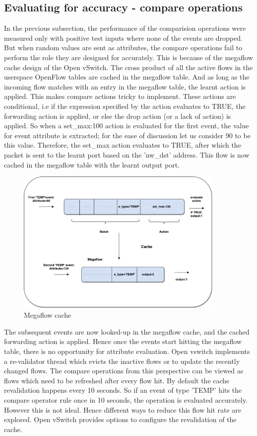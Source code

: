 \subsection{Evaluating for accuracy - compare operations}
In the previous subsection, the performance of the comparision operations were measured only with positive test inputs where none of the events are dropped. But when random values are sent as attributes, the compare operations fail to perform the role they are designed for accurately. This is because of the megaflow cache design of the Open vSwitch. The cross product of all the active flows in the userspace OpenFlow tables are cached in the megaflow table. And as long as the incoming flow matches with an entry in the megaflow table, the learnt action is applied. This makes compare actions tricky to implement. These actions are conditional, i.e if the expression specified by the action evaluates to TRUE, the forwarding action is applied, or else the drop action (or a lack of action) is applied. So when a set_max:100 action is evaluated for the first event, the value for event attribute is extracted; for the ease of discussion let us consider 90 to be this value. Therefore, the set_max action evaluates to TRUE, after which the packet is sent to the learnt port based on the 'nw_dst' address. This flow is now cached in the megaflow table with the learnt output port.
\begin{figure}[H]
	\centering
	\caption{Megaflow cache}
	\includegraphics[height=7cm]{learnandcache.pdf}
\end{figure}
The subsequent events are now looked-up in the megaflow cache, and the cached forwarding action is applied. Hence once the events start hitting the megaflow table, there is no opportunity for attribute evaluation. Open vswitch implements a re-validator thread which evicts the inactive flows or to update the recently changed flows. The compare operations from this perspective can be viewed as flows which need to be refreshed after every flow hit. By default the cache revalidation happens every 10 seconds. So if an event of type 'TEMP' hits the compare operator rule once in 10 seconds, the operation is evaluated accurately. However this is not ideal. Hence different ways to reduce this flow hit rate are explored. Open vSwitch provides options to configure the revalidation of the cache.\newline

